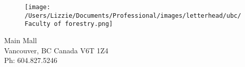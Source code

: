 \documentclass[11pt,a4paper]{article}
\begin{document}

\begin{figure}[htbp]
\hspace*{14cm}                                                           
\hspace{-35ex} \texttt{[image: /Users/Lizzie/Documents/Professional/images/letterhead/ubc/Faculty of forestry.png]}
\end{figure}
\vspace{-10ex}
\begin{small}
 Main Mall \\
\noindent Vancouver, BC Canada V6T 1Z4\\
\noindent Ph: 604.827.5246\\
\end{small}
\vspace{2ex}\\
\end{document}
